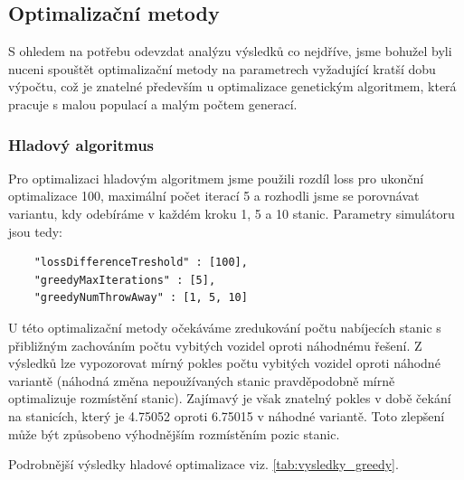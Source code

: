 \subsection{Optimalizační metody}
S ohledem na potřebu odevzdat analýzu výsledků co nejdříve, jsme bohužel byli nuceni
spouštět optimalizační metody na parametrech vyžadující kratší dobu výpočtu, což
je znatelné především u optimalizace genetickým algoritmem, která pracuje s malou populací
a malým počtem generací.

\subsubsection{Hladový algoritmus}
Pro optimalizaci hladovým algoritmem jsme použili rozdíl loss pro ukonční optimalizace
100, maximální počet iterací 5 a rozhodli jsme se porovnávat variantu, kdy 
odebíráme v každém kroku 1, 5 a 10 stanic. Parametry simulátoru jsou tedy:

\begin{verbatim}
    "lossDifferenceTreshold" : [100],
    "greedyMaxIterations" : [5],
    "greedyNumThrowAway" : [1, 5, 10]
\end{verbatim}


U této optimalizační metody očekáváme
zredukování počtu nabíjecích stanic s přibližným zachováním počtu vybitých vozidel oproti náhodnému řešení.
Z výsledků lze vypozorovat mírný pokles počtu vybitých vozidel oproti náhodné variantě (náhodná změna 
nepoužívaných stanic pravděpodobně mírně optimalizuje rozmístění stanic). Zajímavý je však znatelný pokles
v době čekání na stanicích, který je 4.75052 oproti 6.75015 v náhodné variantě. 
Toto zlepšení může být způsobeno výhodnějším rozmístěním pozic stanic.

Podrobnější výsledky hladové optimalizace viz. \cref{tab:vysledky_greedy}.

